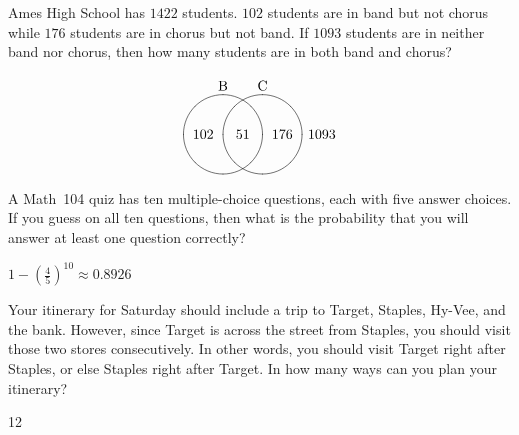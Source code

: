 \documentclass[addpoints,12pt]{exam}
\begin{document}
\begin{questions}
\begin{solution}
\end{solution}

\question[12] Ames High School has $1422$ students.
$102$ students are in band but not chorus while
$176$ students are in chorus but not band.
If $1093$ students are in neither band nor chorus,
then how many students are in both band and chorus?
\begin{solution}
\[\begin{xy}<.5cm,0cm>:
(-1,2)*+!D{\text{B}};
(1,2)*+!D{\text{C}};
(-1,0)*\cir<1cm>{};
(1,0)*\cir<1cm>{};
(0,0)*{51};
(-2,0)*{102};
(2,0)*{176};
(4,0)*{1093};
\end{xy}\]
\end{solution}

\question[12] A Math~104 quiz has ten multiple-choice
questions, each with five answer choices. If you guess on all
ten questions, then what is the probability that you will answer at
least one question correctly?
\begin{solution}
$1-\left(\frac{4}{5}\right)^{10}\approx 0.8926$
\end{solution}

\question[15] Your itinerary for Saturday should
include a trip to Target, Staples, Hy-Vee, and the bank.
However, since Target is across the street from Staples,
you should visit those two stores consecutively. In other
words, you should visit Target right after Staples, or else
Staples right after Target. In how many ways
can you plan your itinerary?
\begin{solution}12\end{solution}

\end{questions}

\vfill
\begin{center}\gradetable[h][questions]\end{center}
\end{document}
